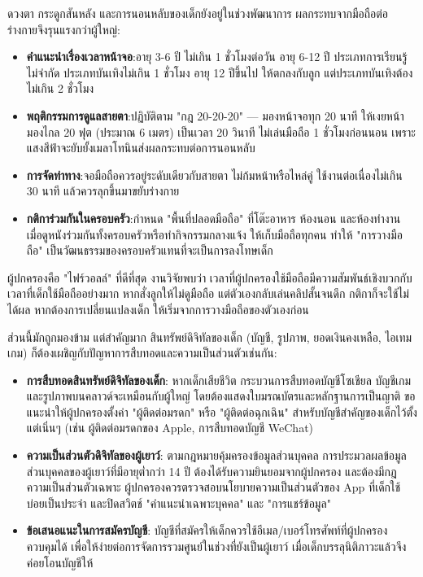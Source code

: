 
ดวงตา กระดูกสันหลัง และการนอนหลับของเด็กยังอยู่ในช่วงพัฒนาการ ผลกระทบจากมือถือต่อร่างกายจึงรุนแรงกว่าผู้ใหญ่:

\begin{itemize}
  \item \textbf{คำแนะนำเรื่องเวลาหน้าจอ}:อายุ 3-6 ปี ไม่เกิน 1 ชั่วโมงต่อวัน อายุ 6-12 ปี ประเภทการเรียนรู้ไม่จำกัด ประเภทบันเทิงไม่เกิน 1 ชั่วโมง อายุ 12 ปีขึ้นไป ให้ตกลงกับลูก แต่ประเภทบันเทิงต้องไม่เกิน 2 ชั่วโมง
  \item \textbf{พฤติกรรมการดูแลสายตา}:ปฏิบัติตาม "กฎ 20-20-20" — มองหน้าจอทุก 20 นาที ให้เงยหน้ามองไกล 20 ฟุต (ประมาณ 6 เมตร) เป็นเวลา 20 วินาที ไม่เล่นมือถือ 1 ชั่วโมงก่อนนอน เพราะแสงสีฟ้าจะยับยั้งเมลาโทนินส่งผลกระทบต่อการนอนหลับ
  \item \textbf{การจัดท่าทาง}:จอมือถือควรอยู่ระดับเดียวกับสายตา ไม่ก้มหน้าหรือไหล่คู่ ใช้งานต่อเนื่องไม่เกิน 30 นาที แล้วควรลุกขึ้นมาขยับร่างกาย
  \item \textbf{กติการ่วมกันในครอบครัว}:กำหนด "พื้นที่ปลอดมือถือ" ที่โต๊ะอาหาร ห้องนอน และห้องทำงาน เมื่อดูหนังร่วมกันทั้งครอบครัวหรือทำกิจกรรมกลางแจ้ง ให้เก็บมือถือทุกคน ทำให้ "การวางมือถือ" เป็นวัฒนธรรมของครอบครัวแทนที่จะเป็นการลงโทษเด็ก
\end{itemize}

\begin{tcbinfo}{ผู้ปกครองคือ "ไฟร์วอลล์" ที่ดีที่สุด}
งานวิจัยพบว่า เวลาที่ผู้ปกครองใช้มือถือมีความสัมพันธ์เชิงบวกกับเวลาที่เด็กใช้มือถืออย่างมาก หากสั่งลูกให้ไม่ดูมือถือ แต่ตัวเองกลับเล่นคลิปสั้นจนดึก กติกาก็จะใช้ไม่ได้ผล หากต้องการเปลี่ยนแปลงเด็ก ให้เริ่มจากการวางมือถือของตัวเองก่อน

\end{tcbinfo}


ส่วนนี้มักถูกมองข้าม แต่สำคัญมาก สินทรัพย์ดิจิทัลของเด็ก (บัญชี, รูปภาพ, ยอดเงินคงเหลือ, ไอเทมเกม) ก็ต้องเผชิญกับปัญหาการสืบทอดและความเป็นส่วนตัวเช่นกัน:

\begin{itemize}
  \item \textbf{การสืบทอดสินทรัพย์ดิจิทัลของเด็ก}: หากเด็กเสียชีวิต กระบวนการสืบทอดบัญชีโซเชียล บัญชีเกม และรูปภาพบนคลาวด์จะเหมือนกับผู้ใหญ่ โดยต้องแสดงใบมรณบัตรและหลักฐานการเป็นญาติ ขอแนะนำให้ผู้ปกครองตั้งค่า "ผู้ติดต่อมรดก" หรือ "ผู้ติดต่อฉุกเฉิน" สำหรับบัญชีสำคัญของเด็กไว้ตั้งแต่เนิ่นๆ (เช่น ผู้ติดต่อมรดกของ Apple, การสืบทอดบัญชี WeChat)
  \item \textbf{ความเป็นส่วนตัวดิจิทัลของผู้เยาว์}: ตามกฎหมายคุ้มครองข้อมูลส่วนบุคคล การประมวลผลข้อมูลส่วนบุคคลของผู้เยาว์ที่มีอายุต่ำกว่า 14 ปี ต้องได้รับความยินยอมจากผู้ปกครอง และต้องมีกฎความเป็นส่วนตัวเฉพาะ ผู้ปกครองควรตรวจสอบนโยบายความเป็นส่วนตัวของ App ที่เด็กใช้บ่อยเป็นประจำ และปิดสวิตช์ "คำแนะนำเฉพาะบุคคล" และ "การแชร์ข้อมูล"
  \item \textbf{ข้อเสนอแนะในการสมัครบัญชี}: บัญชีที่สมัครให้เด็กควรใช้อีเมล/เบอร์โทรศัพท์ที่ผู้ปกครองควบคุมได้ เพื่อให้ง่ายต่อการจัดการรวมศูนย์ในช่วงที่ยังเป็นผู้เยาว์ เมื่อเด็กบรรลุนิติภาวะแล้วจึงค่อยโอนบัญชีให้
\end{itemize}

